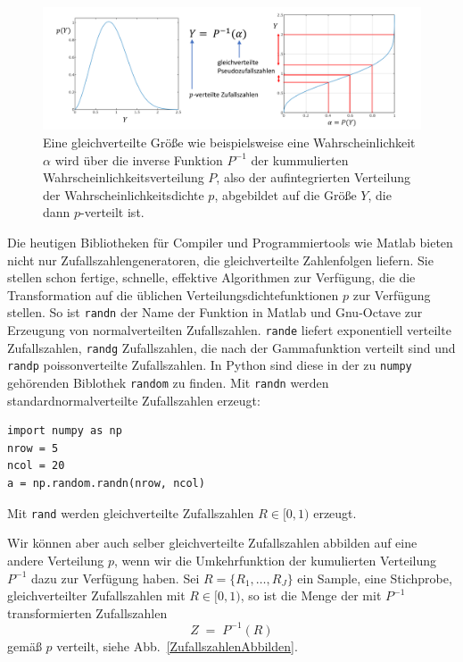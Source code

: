 \begin{figure}
\begin{center}
\includegraphics[width=160mm]{07_vorlesung/media/TransformRandomDistri.pdf}
\caption{\label{pverteilteZufallszahlen} Eine gleichverteilte Größe wie beispielsweise
eine Wahrscheinlichkeit $\alpha$ wird über die inverse Funktion $P^{-1}$ der
kummulierten Wahrscheinlichkeitsverteilung $P$, also der aufintegrierten Verteilung
der Wahrscheinlichkeitsdichte $p$, abgebildet auf die Größe $Y$, die dann $p$-verteilt ist.}
\end{center}
\end{figure}
Die heutigen Bibliotheken für Compiler und Programmiertools wie Matlab bieten nicht nur
Zufallszahlengeneratoren, die gleichverteilte Zahlenfolgen liefern. Sie stellen schon
fertige, schnelle, effektive Algorithmen zur Verfügung, die die Transformation auf die üblichen
Verteilungsdichtefunktionen $p$ zur Verfügung stellen. So ist \texttt{randn} der Name der Funktion
in Matlab und Gnu-Octave zur Erzeugung von normalverteilten Zufallszahlen. \texttt{rande}
liefert exponentiell verteilte Zufallszahlen, \texttt{randg} Zufallszahlen, die nach
der Gammafunktion verteilt sind und \texttt{randp} poissonverteilte Zufallszahlen. In Python sind
diese in der zu \texttt{numpy} gehörenden Biblothek \texttt{random} zu finden. Mit
\texttt{randn} werden standardnormalverteilte Zufallszahlen erzeugt: 
\begin{lstlisting}[style=Python]
import numpy as np
nrow = 5
ncol = 20
a = np.random.randn(nrow, ncol)
\end{lstlisting}
Mit \texttt{rand} werden gleichverteilte Zufallszahlen $R \in [0, 1)$ erzeugt.

Wir können aber auch selber gleichverteilte Zufallszahlen abbilden auf eine andere Verteilung $p$,
wenn wir die Umkehrfunktion der kumulierten Verteilung $P^{-1}$ dazu zur Verfügung haben.
Sei $R = \{R_1, \dots, R_J\}$ ein Sample, eine Stichprobe, gleichverteilter Zufallszahlen mit
$R \in [0,1)$, so ist die Menge der mit $P^{-1}$ transformierten Zufallszahlen
$$
Z \; = \; P^{-1}(R)
$$
gemäß $p$ verteilt, siehe Abb.~\ref{ZufallszahlenAbbilden}.

